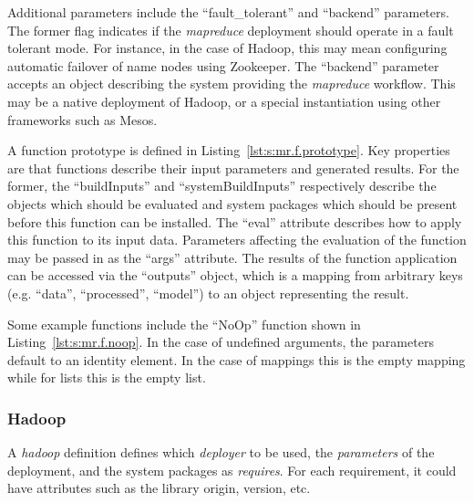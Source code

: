 \documentclass[10pt]{article}
\begin{document}

Additional parameters include the ``fault\_tolerant'' and ``backend''
parameters.  The former flag indicates if the \textit{mapreduce}
deployment should operate in a fault tolerant mode. For instance, in
the case of Hadoop, this may mean configuring automatic failover of
name nodes using Zookeeper.  The ``backend'' parameter accepts an
object describing the system providing the \textit{mapreduce}
workflow.  This may be a native deployment of Hadoop, or a special
instantiation using other frameworks such as Mesos.

A function prototype is defined in Listing~\ref{lst:s:mr.f.prototype}.
Key properties are that functions describe their input parameters and
generated results. For the former, the ``buildInputs'' and
``systemBuildInputs'' respectively describe the objects which should
be evaluated and system packages which should be present before this
function can be installed. The ``eval'' attribute describes how to
apply this function to its input data. Parameters affecting the
evaluation of the function may be passed in as the ``args'' attribute.
The results of the function application can be accessed via the
``outputs'' object, which is a mapping from arbitrary keys
(e.g. ``data'', ``processed'', ``model'') to an object representing
the result.



Some example functions include the ``NoOp'' function shown in
Listing~\ref{lst:s:mr.f.noop}.  In the case of undefined arguments,
the parameters default to an identity element. In the case of mappings
this is the empty mapping while for lists this is the empty list.



\subsubsection{Hadoop}

A \textit{hadoop} definition defines which \textit{deployer} to be used,
the \textit{parameters} of the deployment, and the system packages as
\textit{requires}. For each requirement, it could have attributes such
as the library origin, version, etc.

\end{document}
